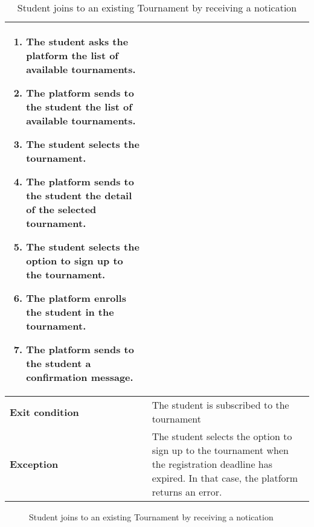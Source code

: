 \begin{enumerate}[label=\textbf{UC\arabic*}:,ref=UC\arabic*,leftmargin=1.3cm]
{\begin{table}[H]
\begin{tabular}{|l|p{11.9cm}|}
\begin{enumerate}[label=\arabic*.]
                              \item The student asks the platform the list of available tournaments.
                              \item The platform sends to the student the list of available tournaments.
                              \item The student selects the tournament.
                              \item The platform sends to the student the detail of the selected tournament.
                              \item The student selects the option to sign up to the tournament.
                              \item The platform enrolls the student in the tournament.
                              \item The platform sends to the student a confirmation message.
                        \end{enumerate}              \\\hline
                        \textbf{Exit condition}  & The student is subscribed to the tournament                                                             \\\hline
                        \textbf{Exception}       & The student selects the option to sign up to the tournament when the registration deadline has expired.
                        In that case, the platform returns an error.                                                                                       \\\hline
                  \end{tabular}
                  \caption{Student joins to an existing Tournament by receiving a notication}
                  \label{table:Student joins to an existing Tournament by receiving a notication}
            \end{table}
            \begin{figure}[H]
                  \centering
                  \caption{Student joins to an existing Tournament by receiving a notication}
                  \label{fig:Student joins to an existing Tournament by receiving a notication}
            \end{figure}
            \pagebreak
      }
\end{enumerate}
